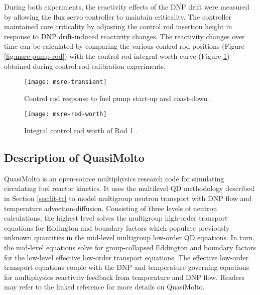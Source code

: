 During both experiments, the reactivity effects of the \gls{DNP} drift were measured by
allowing the flux servo controller to maintain criticality. The controller maintained core
criticality by adjusting the control rod insertion height in response to \gls{DNP} drift-induced
reactivity changes. The reactivity changes over time can be calculated by comparing the various
control rod positions (Figure \ref{fig:msre-pump-rod}) with the control rod integral worth curve
(Figure \ref{fig:msre-rod-worth}) obtained during control rod calibration experiments.

\begin{figure}[htb]
  \centering
  \begin{minipage}[t]{0.49\textwidth}
    \centering
    \texttt{[image: msre-transient]}
    \caption{Control rod response to fuel pump start-up and coast-down
    \cite{prince_zero-power_1968}.}
    \label{fig:msre-pump-rod}
  \end{minipage}
  \hfill
  \begin{minipage}[t]{0.49\textwidth}
    \centering
    \texttt{[image: msre-rod-worth]}
    \caption{Integral control rod worth of Rod 1 \cite{prince_zero-power_1968}.}
    \label{fig:msre-rod-worth}
  \end{minipage}
\end{figure}

\subsection{Description of QuasiMolto}

QuasiMolto \cite{reynolds_analysis_2023} is an open-source multiphysics research code for
simulating circulating fuel reactor kinetics. It uses the multilevel \gls{QD} methodology described
in Section \ref{sec:lit-tc} to model multigroup neutron transport with \gls{DNP} flow and
temperature advection-diffusion. Consisting of three levels of neutron calculations, the highest
level solves the multigroup high-order transport equations for Eddington and boundary factors which
populate previously unknown quantities in the mid-level multigroup low-order \gls{QD} equations.
In turn, the mid-level equations solve for group-collapsed Eddington and boundary factors for the
low-level effective low-order transport equations. The effective low-order transport equations
couple with the \gls{DNP} and temperature governing equations for multiphysics reactivity feedback
from temperature and \gls{DNP} flow. Readers may refer to the linked reference
\cite{reynolds_analysis_2023} for more details on QuasiMolto.

